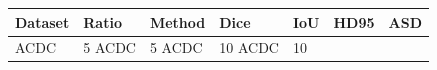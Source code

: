 \begin{tabular}{lllllll}
\toprule
Dataset & Ratio & Method & Dice & IoU & HD95 & ASD \\
\midrule
ACDC & 5%
ACDC & 5%
ACDC & 10%
ACDC & 10%
\bottomrule
\end{tabular}
